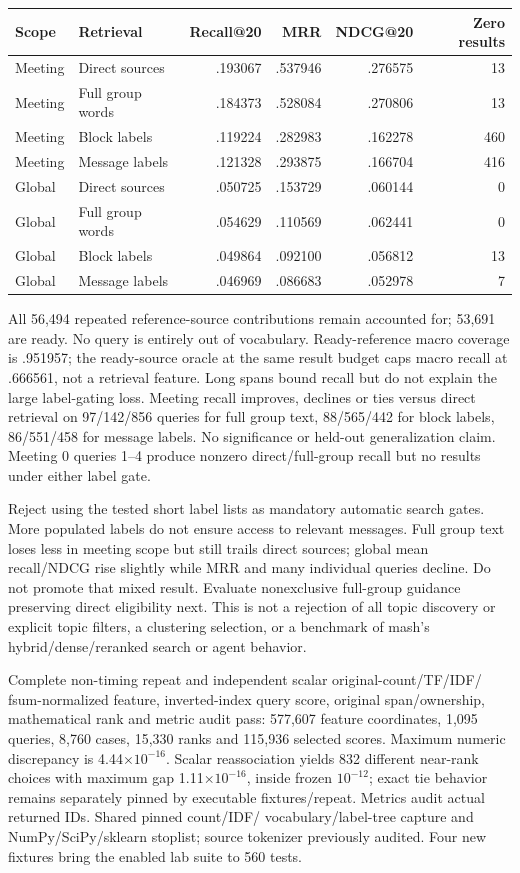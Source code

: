 \documentclass[11pt]{article}
\begin{document}
\begin{center}
\begin{tabular}{llrrrr}
Scope & Retrieval & Recall@20 & MRR & NDCG@20 & Zero results\\
\hline
Meeting & Direct sources & .193067 & .537946 & .276575 & 13\\
Meeting & Full group words & .184373 & .528084 & .270806 & 13\\
Meeting & Block labels & .119224 & .282983 & .162278 & 460\\
Meeting & Message labels & .121328 & .293875 & .166704 & 416\\
Global & Direct sources & .050725 & .153729 & .060144 & 0\\
Global & Full group words & .054629 & .110569 & .062441 & 0\\
Global & Block labels & .049864 & .092100 & .056812 & 13\\
Global & Message labels & .046969 & .086683 & .052978 & 7\\
\end{tabular}
\end{center}
All 56,494 repeated reference-source contributions remain accounted for;
53,691 are ready. No query is entirely out of vocabulary. Ready-reference
macro coverage is .951957; the ready-source oracle at the same result budget
caps macro recall at .666561, not a retrieval feature. Long spans bound recall
but do not explain the large label-gating loss. Meeting recall improves,
declines or ties versus direct retrieval on 97/142/856 queries for full group
text, 88/565/442 for block labels, 86/551/458 for message labels. No
significance or held-out generalization claim. Meeting 0 queries 1--4 produce
nonzero direct/full-group recall but no results under either label gate.

Reject using the tested short label lists as mandatory automatic search
gates. More populated labels do not ensure access to relevant messages. Full
group text loses less in meeting scope but still trails direct sources;
global mean recall/NDCG rise slightly while MRR and many individual queries
decline. Do not promote that mixed result. Evaluate nonexclusive full-group
guidance preserving direct eligibility next. This is not a rejection of all
topic discovery or explicit topic filters, a clustering selection, or a
benchmark of mash's hybrid/dense/reranked search or agent behavior.

Complete non-timing repeat and independent scalar original-count/TF/IDF/
fsum-normalized feature, inverted-index query score, original span/ownership,
mathematical rank and metric audit pass: 577,607 feature coordinates, 1,095
queries, 8,760 cases, 15,330 ranks and 115,936 selected scores. Maximum
numeric discrepancy is 4.44$\times10^{-16}$. Scalar reassociation yields 832
different near-rank choices with maximum gap 1.11$\times10^{-16}$, inside
frozen $10^{-12}$; exact tie behavior remains separately pinned by executable
fixtures/repeat. Metrics audit actual returned IDs. Shared pinned count/IDF/
vocabulary/label-tree capture and NumPy/SciPy/sklearn stoplist; source tokenizer
previously audited. Four new fixtures bring the enabled lab suite to 560 tests.
\end{document}
